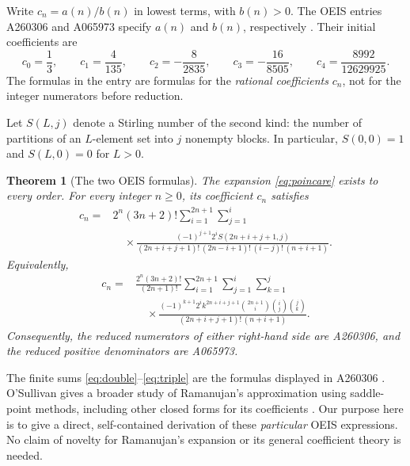 \documentclass[11pt,letterpaper]{article}
\numberwithin{equation}{section}
\newtheorem{theorem}{Theorem}[section]
\theoremstyle{remark}
\begin{document}
Write $c_n=a(n)/b(n)$ in lowest terms, with $b(n)>0$. The OEIS entries
A260306 and A065973 specify $a(n)$ and $b(n)$, respectively
\cite{oeis260306,oeis065973}. Their initial coefficients are
\begin{equation}
 c_0=\frac13,\qquad c_1=\frac4{135},\qquad
 c_2=-\frac8{2835},\qquad c_3=-\frac{16}{8505},\qquad
 c_4=\frac{8992}{12629925}.
 \label{eq:initial}
\end{equation}
The formulas in the entry are formulas for the \emph{rational coefficients}
$c_n$, not for the integer numerators before reduction.

Let $S(L,j)$ denote a Stirling number of the second kind: the number of
partitions of an $L$-element set into $j$ nonempty blocks. In particular,
$S(0,0)=1$ and $S(L,0)=0$ for $L>0$.

\begin{theorem}[The two OEIS formulas]
\label{thm:main}
The expansion \eqref{eq:poincare} exists to every order. For every integer
$n\geq0$, its coefficient $c_n$ satisfies
\begin{equation}
\begin{split}
 c_n={}&2^n(3n+2)!
 \sum_{i=1}^{2n+1}\sum_{j=1}^{i}\\[-2pt]
 &\quad\times
 \frac{(-1)^{j+1}2^i S(2n+i+j+1,j)}
 {(2n+i+j+1)!\,(2n-i+1)!\,(i-j)!\,(n+i+1)}.
\end{split}
\label{eq:double}
\end{equation}
Equivalently,
\begin{equation}
\begin{split}
 c_n={}&\frac{2^n(3n+2)!}{(2n+1)!}
 \sum_{i=1}^{2n+1}\sum_{j=1}^{i}\sum_{k=1}^{j}\\[-2pt]
 &\quad\times
 \frac{(-1)^{k+1}2^i k^{2n+i+j+1}
       \binom{2n+1}{i}\binom{i}{j}\binom{j}{k}}
 {(2n+i+j+1)!\,(n+i+1)}.
\end{split}
\label{eq:triple}
\end{equation}
Consequently, the reduced numerators of either right-hand side are
A260306, and the reduced positive denominators are A065973.
\end{theorem}

The finite sums \eqref{eq:double}--\eqref{eq:triple} are the formulas displayed
in A260306 \cite{oeis260306}. O'Sullivan gives a broader study of Ramanujan's
approximation using saddle-point methods, including other closed forms
for its coefficients \cite{osullivan}. Our purpose here is to give a direct,
self-contained derivation of these \emph{particular} OEIS expressions.
No claim of novelty for Ramanujan's expansion or its general coefficient
theory is needed.
\end{document}
